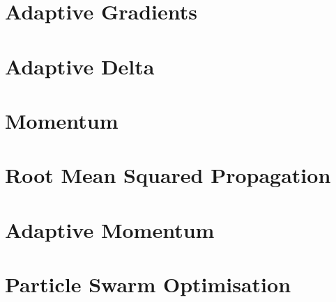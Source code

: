 
\section{Adaptive Gradients}
\label{sec:heuristics:adaptive-gradients}






\section{Adaptive Delta}
\label{sec:heuristics:adaptive-delta}






\section{Momentum}
\label{sec:heuristics:momentum}






\section{Root Mean Squared Propagation}
\label{sec:heuristics:rmsprop}






\section{Adaptive Momentum}
\label{sec:heuristics:adam}




\section{Particle Swarm Optimisation}
\label{sec:heuristics:pso}






